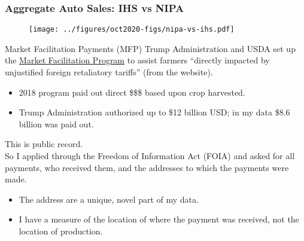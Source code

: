 \documentclass[9pt,pdftex,aspectratio=1610]{beamer}
\theoremstyle{definition}
\begin{document}

\begin{frame}[t]
\frametitle{Aggregate Auto Sales: IHS vs NIPA}
\begin{figure}[t]
\centerline{\texttt{[image: ../figures/oct2020-figs/nipa-vs-ihs.pdf]}}
\end{figure}
\end{frame}


\begin{frame}[t]{Market Facilitation Payments (MFP)}
Trump Administration and USDA set up the \href{https://www.federalregister.gov/documents/2018/08/30/2018-18842/market-facilitation-program}{Market Facilitation Program} to assist farmers ``directly impacted by unjustified foreign retaliatory tariffs'' (from the website).
\begin{itemize}
\smallskip
\item 2018 program paid out direct \$\$\$  based upon crop harvested.
\smallskip
\item Trump Administration authorized up to \$12 billion USD; in my data \$8.6 billion was paid out.
\end{itemize}
\bigskip
This is public record.\\
\smallskip
So I applied through the Freedom of Information Act (FOIA) and asked for all payments, who received them, and the addresses to which the payments were made.
\begin{itemize}
\smallskip
\item The address are a unique, novel part of my data.
\smallskip
\item I have a measure of the location of where the payment was received, not the location of production.
\end{itemize}
\end{frame}

\end{document}
